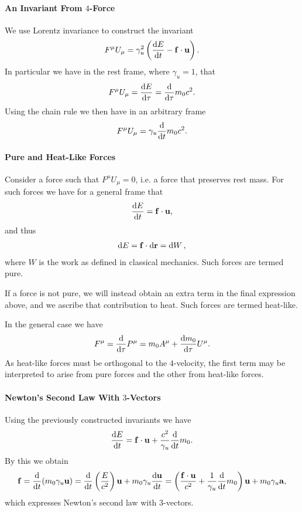 \paragraph{An Invariant From $4$-Force}
We use Lorentz invariance to construct the invariant
\begin{align*}
	F^{\mu}U_{\mu} = \gamma_{u}^{2}\left(\dv{E}{t} - \vb{f}\cdot\vb{u}\right).
\end{align*}
In particular we have in the rest frame, where $\gamma_{u}  =1$, that
\begin{align*}
	F^{\mu}U_{\mu} = \dv{E}{\tau} = \dv{\tau}m_{0}c^{2}.
\end{align*}
Using the chain rule we then have in an arbitrary frame
\begin{align*}
	F^{\mu}U_{\mu} = \gamma_{u}\dv{t}m_{0}c^{2}.
\end{align*}

\paragraph{Pure and Heat-Like Forces}
Consider a force such that $F^{\mu}U_{\mu} = 0$, i.e. a force that preserves rest mass. For such forces we have for a general frame that
\begin{align*}
	\dv{E}{t} = \vb{f}\cdot\vb{u},
\end{align*}
and thus
\begin{align*}
	\dd{E} = \vb{f}\cdot\dd{\vb{r}} = \dd{W},
\end{align*}
where $W$ is the work as defined in classical mechanics. Such forces are termed pure.

If a force is not pure, we will instead obtain an extra term in the final expression above, and we ascribe that contribution to heat. Such forces are termed heat-like.

In the general case we have
\begin{align*}
	F^{\mu} = \dv{\tau}P^{\mu} = m_{0}A^{\mu} + \dv{m_{0}}{\tau}U^{\mu}.
\end{align*}
As heat-like forces must be orthogonal to the $4$-velocity, the first term may be interpreted to arise from pure forces and the other from heat-like forces.

\paragraph{Newton's Second Law With $3$-Vectors}
Using the previously constructed invariants we have
\begin{align*}
	\dv{E}{t} = \vb{f}\cdot\vb{u} + \frac{c^{2}}{\gamma_{u}}\dv{t}m_{0}.
\end{align*}
By this we obtain
\begin{align*}
	\vb{f} = \dv{t}(m_{0}\gamma_{u}\vb{u}) = \dv{t}\left(\frac{E}{c^{2}}\right)\vb{u} + m_{0}\gamma_{u}\dv{\vb{u}}{t} = \left(\frac{\vb{f}\cdot\vb{u}}{c^{2}} + \frac{1}{\gamma_{u}}\dv{t}m_{0}\right)\vb{u} + m_{0}\gamma_{u}\vb{a},
\end{align*}
which expresses Newton's second law with $3$-vectors.